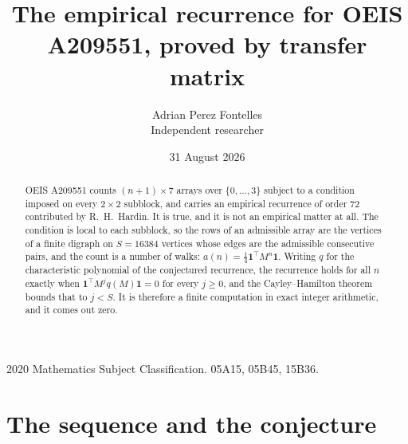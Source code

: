 \documentclass[11pt,a4paper]{article}
\title{The empirical recurrence for OEIS A209551, proved by transfer matrix}
\author{Adrian Perez Fontelles\\ \small Independent researcher}
\date{31 August 2026}
\theoremstyle{plain}
\theoremstyle{definition}
\begin{document}
\maketitle

\begin{abstract}
OEIS A209551 counts $(n+1)\times7$ arrays over $\{0,\dots,3\}$ subject to a condition imposed on
every $2\times2$ subblock, and carries an empirical recurrence of order $72$ contributed
by R.~H.~Hardin. It is true, and it is not an empirical matter at all. The condition is local
to each subblock, so the rows of an admissible array are the vertices of a finite digraph
on $S=16384$ vertices whose edges are the admissible consecutive pairs, and the count is a
number of walks: $a(n)=\tfrac1{4}\mathbf{1}^{\!\top}M^{n}\mathbf{1}$. Writing $q$
for the characteristic polynomial of the conjectured recurrence, the recurrence holds for all
$n$ exactly when $\mathbf{1}^{\!\top}M^{j}q(M)\mathbf{1}=0$ for every $j\ge0$, and the
Cayley--Hamilton theorem bounds that to $j<S$. It is therefore a finite computation in exact
integer arithmetic, and it comes out zero.
\end{abstract}

\noindent\small 2020 Mathematics Subject Classification. 05A15, 05B45, 15B36.\normalsize

\section{The sequence and the conjecture}
\end{document}
